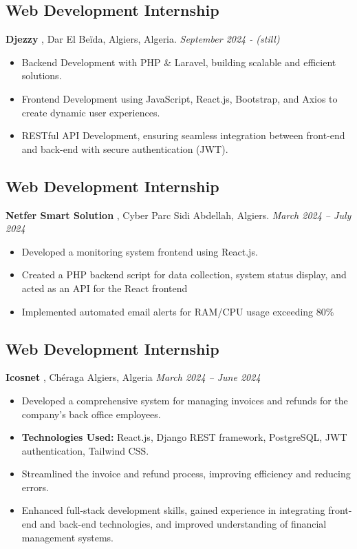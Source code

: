 \documentclass[a4paper,12pt]{article}
\begin{document}
\subsection*{Web Development Internship} 
\textbf{Djezzy }, Dar El Beïda, Algiers, Algeria.  \hfil
\textit{September 2024 - (still) } \\
\begin{itemize}
     
  \item Backend Development with PHP \& Laravel, building scalable and efficient solutions.
  \item Frontend Development using JavaScript, React.js, Bootstrap, and Axios to create dynamic user experiences.
  \item RESTful API Development, ensuring seamless integration between front-end and back-end with secure authentication (JWT).

\end{itemize}



\subsection*{Web Development Internship} 
\textbf{Netfer Smart Solution}  , Cyber Parc Sidi Abdellah, Algiers.  \hfil
\textit{March 2024 – July 2024} \\
\begin{itemize}
    \item Developed a monitoring system frontend using React.js.
    \item Created a PHP backend script for data collection, system status display, and acted as an API for the React frontend
    \item Implemented automated email alerts for RAM/CPU usage exceeding 80\%

\end{itemize}



\subsection*{Web Development Internship} 
\textbf{Icosnet} , Chéraga Algiers, Algeria \hfil
\textit{March 2024 – June 2024} \\
\begin{itemize}
    \item Developed a comprehensive system for managing invoices and refunds for the company’s back office employees.
    \item \textbf{Technologies Used:} React.js, Django REST framework, PostgreSQL, JWT authentication, Tailwind CSS.
    \item Streamlined the invoice and refund process, improving efficiency and reducing errors.
    \item Enhanced full-stack development skills, gained experience in integrating front-end and back-end technologies, and improved understanding of financial management systems.
\end{itemize}
\end{document}
